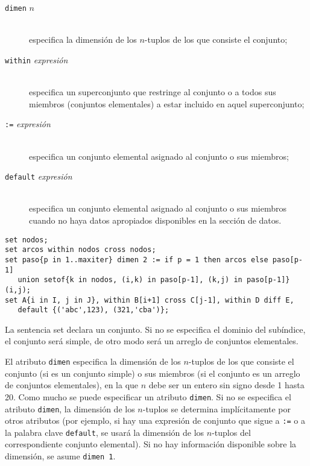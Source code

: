 \documentclass[11pt,spanish]{report}
\def\para#1{\noindent{\bf#1}}
\begin{document}
\begin{description}
\item[{\tt dimen} $n$]\hspace*{0pt}\\
especifica la dimensión de los $n$-tuplos de los que consiste el conjunto;
\item[{\tt within} {\it expresión}]\hspace*{0pt}\\
especifica un superconjunto que restringe al conjunto o a todos sus miembros (conjuntos elementales) a estar incluido en aquel superconjunto;
\item[{\tt:=} {\it expresión}]\hspace*{0pt}\\
especifica un conjunto elemental asignado al conjunto o sus miembros;
\item[{\tt default} {\it expresión}]\hspace*{0pt}\\
especifica un conjunto elemental asignado al conjunto o sus miembros cuando no haya datos apropiados disponibles en la sección de datos.
\end{description}

\vspace*{-8pt}

\para{Ejemplos}

\begin{verbatim}
set nodos;
set arcos within nodos cross nodos;
set paso{p in 1..maxiter} dimen 2 := if p = 1 then arcos else paso[p-1]
   union setof{k in nodos, (i,k) in paso[p-1], (k,j) in paso[p-1]}(i,j);
set A{i in I, j in J}, within B[i+1] cross C[j-1], within D diff E,
   default {('abc',123), (321,'cba')};
\end{verbatim}

La sentencia set declara un conjunto. Si no se especifica el dominio del subíndice, el conjunto será simple, de otro modo será un arreglo de conjuntos elementales.

El atributo {\tt dimen} especifica la dimensión de los $n$-tuplos de los que consiste el conjunto (si es un conjunto simple) o sus miembros (si el conjunto es un arreglo de conjuntos elementales), en la que $n$ debe ser un entero sin signo desde 1 hasta 20. Como mucho se puede especificar un atributo {\tt dimen}. Si no se especifica el atributo {\tt dimen}, la dimensión de los $n$-tuplos se determina implícitamente por otros atributos (por ejemplo, si hay una expresión de conjunto que sigue a {\tt :=} o a la palabra clave {\tt default}, se usará la dimensión de los $n$-tuplos del correspondiente conjunto elemental). Si no hay información disponible sobre la dimensión, se asume {\tt dimen 1}.
\end{document}
